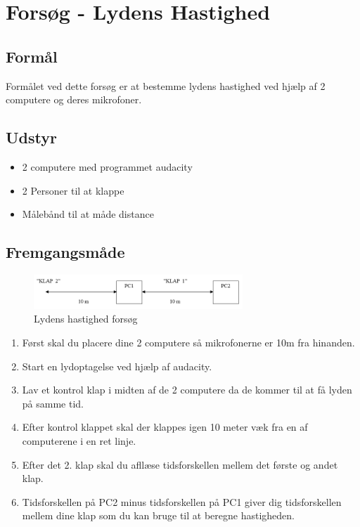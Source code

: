 \section{Forsøg - Lydens Hastighed}
\subsection{Formål}
Formålet ved dette forsøg er at bestemme lydens hastighed ved hjælp af 2 computere og deres mikrofoner.

\subsection{Udstyr}
\begin{itemize}
    \item 2 computere med programmet audacity
    \item 2 Personer til at klappe
    \item Målebånd til at måde distance
\end{itemize}

\subsection{Fremgangsmåde}
\begin{figure}[h!]
    \centering
    \includegraphics[width=0.7\textwidth]{figures/lydenshastighedforsog.png}
    \caption{Lydens hastighed forsøg}
\end{figure}
\begin{enumerate}
    \item Først skal du placere dine 2 computere så mikrofonerne er 10m fra hinanden.
    \item Start en lydoptagelse ved hjælp af audacity.
    \item Lav et kontrol klap i midten af de 2 computere da de kommer til at få lyden på samme tid.
    \item Efter kontrol klappet skal der klappes igen 10 meter væk fra en af computerene i en ret linje.
    \item Efter det 2. klap skal du afllæse tidsforskellen mellem det første og andet klap.
    \item Tidsforskellen på PC2 minus tidsforskellen på PC1 giver dig tidsforskellen mellem dine klap som du kan bruge til at beregne hastigheden.
\end{enumerate}

